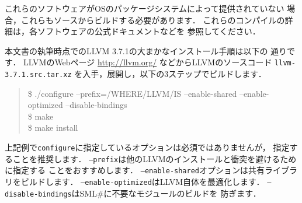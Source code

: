 \documentclass{jbook}
\newcommand{\smlsharp}{SML\#}
\newenvironment{program}{\begin{quote}\begin{tt}}%
                        {\end{tt}\end{quote}}
\begin{document}
	これらのソフトウェアがOSのパッケージシステムによって提供されていない
場合，これらもソースからビルドする必要があります．
	これらのコンパイルの詳細は，各ソフトウェアの公式ドキュメントなどを
参照してください．

	本文書の執筆時点でのLLVM 3.7.1の大まかなインストール手順は以下の
通りです．
	LLVMのWebページ \url{http://llvm.org/} などからLLVMのソースコード
{\tt llvm-3.7.1.src.tar.xz}%
を入手，展開し，以下の3ステップでビルドします．
\begin{program}
\$ ./configure --prefix=/WHERE/LLVM/IS --enable-shared --enable-optimized --disable-bindings\\
\$ make\\
\$ make install
\end{program}
	上記例で{\tt configure}に指定しているオプションは必須ではありませんが，
指定することを推奨します．
	{\tt --prefix}は他のLLVMのインストールと衝突を避けるために指定する
ことをおすすめします．
	{\tt --enable-shared}オプションは共有ライブラリをビルドします．
	{\tt --enable-optimized}はLLVM自体を最適化します．
	{\tt --disable-bindings}は\smlsharp{}に不要なモジュールのビルドを
防ぎます．
\end{document}
